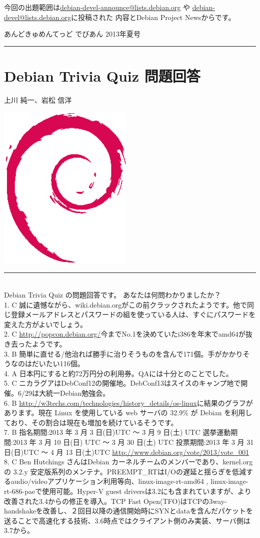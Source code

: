 \documentclass[mingoth,a4paper]{jsarticle}
\renewcommand{\dancersection}[2]{%
\newpage
あんどきゅめんてっど でびあん 2013年夏号
%
\vspace{0.1mm}\\
{\color{dancerdarkblue}\rule{\hsize}{2mm}}

%
%
\begin{minipage}[t]{0.6\hsize}
\color{dancerdarkblue}
\vspace{1cm}
\section{#1}
\hfill{}#2\\
\end{minipage}
\begin{minipage}[t]{0.4\hsize}
\vspace{-2cm}
\hfill{}\includegraphics[height=8cm]{image200502/openlogo-nd.eps}\\
\vspace{-5cm}
\end{minipage}
%
{\color{dancerlightblue}\rule{0.66\hsize}{2mm}}
%
\vspace{2cm}
}
\begin{document}
今回の出題範囲は\url{debian-devel-announce@lists.debian.org} や \url{debian-devel@lists.debian.org}に投稿された
内容とDebian Project Newsからです。

\begin{multicols}{2}



\end{multicols}

\printindex

\cleartoevenpage
\dancersection{Debian Trivia Quiz 問題回答}{上川 純一、岩松 信洋}
\\
{\small
 Debian Trivia Quiz の問題回答です。 あなたは何問わかりましたか？ \\
1. C 誠に遺憾ながら、wiki.debian.orgがこの前クラックされたようです。他で同じ登録メールアドレスとパスワードの組を使っている人は、すぐにパスワードを変えた方がよいでしょう。\\
2. C \url {http://popcon.debian.org/}今までNo.1を決めていたi386を年末でamd64が抜き去ったようです。\\
3. B 簡単に直せる/他治れば勝手に治りそうものを含んで171個。手がかかりそうなのはだいたい116個。\\
4. A 日本円にすると約72万円分の利用券。QAには十分とのことでした。\\
5. C ニカラグアはDebConf12の開催地。DebConf13はスイスのキャンプ地で開催。6/29は大統一Debian勉強会。\\
6. B \url {http://w3techs.com/technologies/history_details/os-linux}に結果のグラフがあります。現在 Linux を使用している web サーバの 32.9\% が Debian を利用しており、その割合は現在も増加を続けているそうです。\\
7. B 指名期間:2013 年 3 月 3 日(日)UTC 〜 3 月 9 日(土) UTC 選挙運動期間:2013 年 3 月 10 日(日) UTC 〜 3 月 30 日(土) UTC 投票期間:2013 年 3 月 31 日(日)UTC 〜 4 月 13 日(土)UTC \url {http://www.debian.org/vote/2013/vote_001}\\
8. C Ben Hutchings さんはDebian カーネルチームのメンバーであり、kernel.org の 3.2.y 安定版系列のメンテナ。PREEMPT\_RTはI/Oの遅延と揺らぎを低減するaudio/videoアプリケーション利用等向、linux-image-rt-amd64 , linux-image-rt-686-paeで使用可能。Hyper-V guest driversは3.2にも含まれていますが、より改善された3.4からの修正を導入。TCP Fast Open(TFO)はTCPの3way-handshakeを改善し、２回目以降の通信開始時にSYNとdataを含んだパケットを送ることで高速化する技術、3.6時点ではクライアント側のみ実装、サーバ側は3.7から。\\
}
\end{document}
